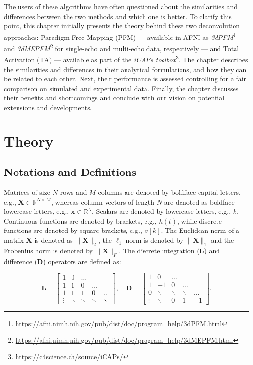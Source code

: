 The users of these algorithms have often questioned about the similarities and
differences between the two methods and which one is better. To clarify this
point, this chapter initially presents the theory behind these two deconvolution
approaches: Paradigm Free Mapping (PFM) \citep{Gaudes2013Paradigmfreemapping} --- available
in AFNI as
\textit{3dPFM}\footnote{\url{https://afni.nimh.nih.gov/pub/dist/doc/program_help/3dPFM.html}}
and
\textit{3dMEPFM}\footnote{\url{https://afni.nimh.nih.gov/pub/dist/doc/program_help/3dMEPFM.html}}
for single-echo and multi-echo data, respectively --- and Total Activation (TA)
\citep{Karahanoglu2013TotalactivationfMRI} --- available as part of the
\textit{iCAPs toolbox}\footnote{\url{https://c4science.ch/source/iCAPs/}}. The
chapter describes the similarities and differences in their analytical
formulations, and how they can be related to each other. Next, their performance
is assessed controlling for a fair comparison on simulated and experimental
data. Finally, the chapter discusses their benefits and shortcomings and
conclude with our vision on potential extensions and developments.

\section{Theory}
\label{sec:synthesis_theory}
\subsection{Notations and Definitions}

Matrices of size $N$ rows and $M$ columns are denoted by boldface capital
letters, e.g., $\mathbf{X} \in \mathbb{R}^{N\times M}$, whereas column vectors
of length $N$ are denoted as boldface lowercase letters, e.g., $\mathbf{x} \in
\mathbb{R}^{N}$. Scalars are denoted by lowercase letters, e.g., $k$. Continuous
functions are denoted by brackets, e.g., $h(t)$, while discrete functions are
denoted by square brackets, e.g., $x[k]$. The Euclidean norm of a matrix
$\mathbf{X}$ is denoted as $\|\mathbf{X}\|_2$, the $\ell_1$-norm is denoted by
$\| \mathbf{X} \|_1$ and the Frobenius norm is denoted by $\| \mathbf{X} \|_F$.
The discrete integration ($\mathbf{L}$) and difference ($\mathbf{D}$) operators
are defined as:

$$
\mathbf{L} = \left[\begin{array}{ccccc}
1 & 0 & \ldots & & \\
1 & 1 & 0 & \ldots & \\
1 & 1 & 1 & 0 & \ldots \\
\vdots & \ddots & \ddots & \ddots & \ddots
\end{array}\right], \quad \mathbf{D} = \left[\begin{array}{ccccc}
1 & 0 & \ldots & & \\
1 & -1 & 0 & \ldots & \\
0 & \ddots & \ddots & \ddots & \ldots \\
\vdots & \ddots & 0 & 1 & -1
\end{array}\right].
$$

